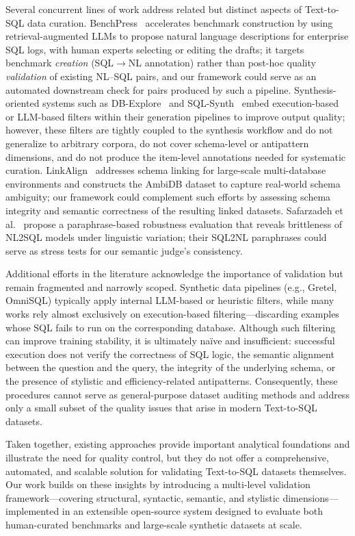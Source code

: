 \documentclass[print]{einformatica}
\begin{document}
Several concurrent lines of work address related but distinct aspects of Text-to-SQL data curation. BenchPress~\cite{wenz2025benchpress} accelerates benchmark construction by using retrieval-augmented LLMs to propose natural language descriptions for enterprise SQL logs, with human experts selecting or editing the drafts; it targets benchmark \emph{creation} (SQL$\rightarrow$NL annotation) rather than post-hoc quality \emph{validation} of existing NL--SQL pairs, and our framework could serve as an automated downstream check for pairs produced by such a pipeline. Synthesis-oriented systems such as DB-Explore~\cite{ma2025dbexplore} and SQL-Synth~\cite{wang2025sqlsynth} embed execution-based or LLM-based filters within their generation pipelines to improve output quality; however, these filters are tightly coupled to the synthesis workflow and do not generalize to arbitrary corpora, do not cover schema-level or antipattern dimensions, and do not produce the item-level annotations needed for systematic curation. LinkAlign~\cite{wang2025linkalign} addresses schema linking for large-scale multi-database environments and constructs the AmbiDB dataset to capture real-world schema ambiguity; our framework could complement such efforts by assessing schema integrity and semantic correctness of the resulting linked datasets. Safarzadeh et al.~\cite{safarzadeh2025sql2nl} propose a paraphrase-based robustness evaluation that reveals brittleness of NL2SQL models under linguistic variation; their SQL2NL paraphrases could serve as stress tests for our semantic judge's consistency.

Additional efforts in the literature acknowledge the importance of validation but remain fragmented and narrowly scoped. Synthetic data pipelines (e.g., Gretel, OmniSQL) typically apply internal LLM-based or heuristic filters, while many works rely almost exclusively on execution-based filtering---discarding examples whose SQL fails to run on the corresponding database. Although such filtering can improve training stability, it is ultimately naïve and insufficient: successful execution does not verify the correctness of SQL logic, the semantic alignment between the question and the query, the integrity of the underlying schema, or the presence of stylistic and efficiency-related antipatterns. Consequently, these procedures cannot serve as general-purpose dataset auditing methods and address only a small subset of the quality issues that arise in modern Text-to-SQL datasets.

Taken together, existing approaches provide important analytical foundations and illustrate the need for quality control, but they do not offer a comprehensive, automated, and scalable solution for validating Text-to-SQL datasets themselves. Our work builds on these insights by introducing a multi-level validation framework---covering structural, syntactic, semantic, and stylistic dimensions---implemented in an extensible open-source system designed to evaluate both human-curated benchmarks and large-scale synthetic datasets at scale.
\end{document}
